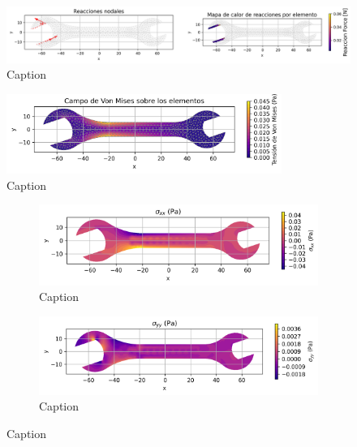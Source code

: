 \documentclass{article}  %
\begin{document}
\begin{figure}[H]
  \centering
  \includegraphics[width=1\textwidth]{GRAFICOS/Case d_deformada_reacciones.png}
  \caption{Caption}
  \label{fig:principal}
\end{figure}

\begin{figure}[H]
  \centering
  \includegraphics[width=0.8\textwidth]{GRAFICOS/Case d_von_mises.png}
  \caption{Caption}
  \label{fig:principal}
\end{figure}

\begin{figure}[H]
  \centering
  \begin{subfigure}[t]{0.49\textwidth}
    \centering
    \includegraphics[width=\textwidth]{GRAFICOS/Case d - sigma_xx.png}
    \caption{Caption}
    \label{fig:deformada_reacciones}
  \end{subfigure}
  \hfill
  \begin{subfigure}[t]{0.49\textwidth}
    \centering
    \includegraphics[width=\textwidth]{GRAFICOS/Case d - sigma_yy.png}
    \caption{Caption}
    \label{fig:von_mises}
  \end{subfigure}
  \caption{Caption}
  \label{fig:analisis_estructural}
\end{figure}
\end{document}
